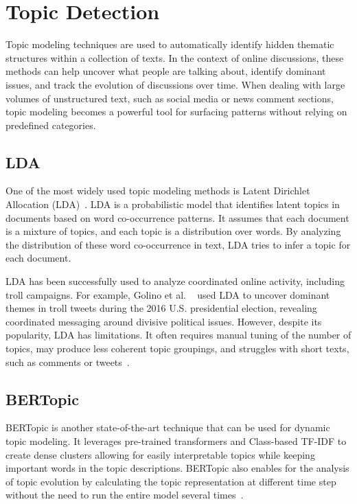 \documentclass[twoside]{ctuthesis}
\theoremstyle{plain}
\theoremstyle{definition}
\theoremstyle{note}
\begin{document}
\section{Topic Detection}

Topic modeling techniques are used to automatically identify hidden thematic structures within a collection of texts. In the context of online discussions, these methods can help uncover what people are talking about, identify dominant issues, and track the evolution of discussions over time. When dealing with large volumes of unstructured text, such as social media or news comment sections, topic modeling becomes a powerful tool for surfacing patterns without relying on predefined categories.

\subsection{LDA}
One of the most widely used topic modeling methods is Latent Dirichlet Allocation (LDA)~\cite{Blei2001LDA}. LDA is a probabilistic model that identifies latent topics in documents based on word co-occurrence patterns. It assumes that each document is a mixture of topics, and each topic is a distribution over words. By analyzing the distribution of these word co-occurrence in text, LDA tries to infer a topic for each document.\par
LDA has been successfully used to analyze coordinated online activity, including troll campaigns. For example, Golino et al. ~\cite{Golino2022Elections} used LDA to uncover dominant themes in troll tweets during the 2016 U.S. presidential election, revealing coordinated messaging around divisive political issues. However, despite its popularity, LDA has limitations. It often requires manual tuning of the number of topics, may produce less coherent topic groupings, and struggles with short texts, such as comments or tweets~\cite{Ruediger2022TopicModellingRevisited}.\par

\subsection{BERTopic}
BERTopic is another state-of-the-art technique that can be used for dynamic topic modeling. It leverages pre-trained transformers and Class-based TF-IDF to create dense clusters allowing for easily interpretable topics while keeping important words in the topic descriptions. BERTopic also enables for the analysis of topic evolution by calculating the topic representation at different time step without the need to run the entire model several times~\cite{Grootendorst2022BERTopic}.
\end{document}
